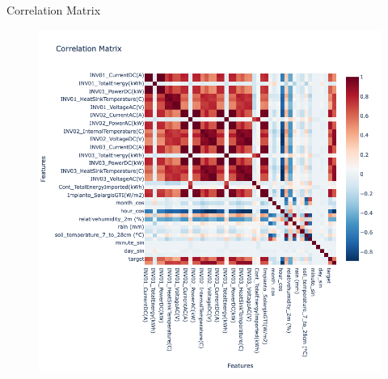 \begin{frame}{Correlation Matrix}
	\begin{figure}
		\centering
		\includegraphics[width=.7\textwidth]{sections/2_preprocessing/imgs/correlationmatrix.png}
	\end{figure}
\end{frame}